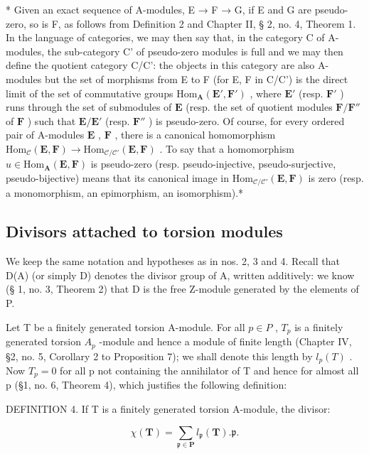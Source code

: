 * Given an exact sequence of A-modules, E → F → G, if E and G are pseudo-zero, so is F, as follows from Definition 2 and Chapter II, § 2, no. 4, Theorem 1. In the language of categories, we may then say that, in the category C of A-modules, the sub-category C' of pseudo-zero modules is full and we may then define the quotient category C/C': the objects in this category are also A-modules but the set of morphisms from E to F (for E, F in C/C') is the direct limit of the set of commutative groups \(\mathrm{Hom}_{\mathbf{A}}(\mathbf{E}',\mathbf{F}')\) , where \(\mathbf{E}'\) (resp. \(\mathbf{F}'\) ) runs through the set of submodules of \(\mathbf{E}\) (resp. the set of quotient modules \(\mathbf{F} / \mathbf{F}''\) of \(\mathbf{F}\) ) such that \(\mathbf{E} / \mathbf{E}'\) (resp. \(\mathbf{F}''\) ) is pseudo-zero. Of course, for every ordered pair of A-modules \(\mathbf{E}\) , \(\mathbf{F}\) , there is a canonical homomorphism \(\mathrm{Hom}_{\mathcal{C}}(\mathbf{E},\mathbf{F})\to \mathrm{Hom}_{\mathcal{C} / \mathcal{C}'}(\mathbf{E},\mathbf{F})\) . To say that a homomorphism \(u\in \mathrm{Hom}_{\mathbf{A}}(\mathbf{E},\mathbf{F})\) is pseudo-zero (resp. pseudo-injective, pseudo-surjective, pseudo-bijective) means that its canonical image in \(\mathrm{Hom}_{\mathcal{C} / \mathcal{C}'}(\mathbf{E},\mathbf{F})\) is zero (resp. a monomorphism, an epimorphism, an isomorphism).*

\subsection{Divisors attached to torsion modules}

We keep the same notation and hypotheses as in nos. 2, 3 and 4. Recall that D(A) (or simply D) denotes the divisor group of A, written additively: we know (§ 1, no. 3, Theorem 2) that D is the free Z-module generated by the elements of P.

Let T be a finitely generated torsion A-module. For all \(p \in P\) , \(T_{p}\) is a finitely generated torsion \(A_{p}\) -module and hence a module of finite length (Chapter IV, §2, no. 5, Corollary 2 to Proposition 7); we shall denote this length by \(l_{p}(T)\) . Now \(T_{p} = 0\) for all p not containing the annihilator of T and hence for almost all p (§1, no. 6, Theorem 4), which justifies the following definition:

DEFINITION 4. If T is a finitely generated torsion A-module, the divisor:

\[
\chi (\mathbf {T}) = \sum_ {\mathfrak {p} \in \mathbf {P}} l _ {\mathfrak {p}} (\mathbf {T}). \mathfrak {p}.
\]

